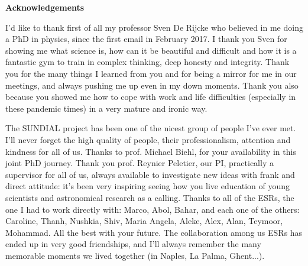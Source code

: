 \clearpage
\thispagestyle{empty}
\null%
\label{thesis:acknowledgements}
\begin{center}
  {\Large \textbf{Acknowledgements}}\\
\end{center}
{\small{}
I'd like to thank first of all my professor Sven De Rijcke who believed in me doing a PhD in physics, since the first email in February 2017.
I thank you Sven for showing me what science is, how can it be beautiful and difficult and how it is a fantastic gym to train in complex thinking, deep honesty and integrity.
Thank you for the many things I learned from you and for being a mirror for me in our meetings, and always pushing me up even in my down moments.
Thank you also because you showed me how to cope with work and life difficulties (especially in these pandemic times) in a very mature and ironic way.

The SUNDIAL project has been one of the nicest group of people I've ever met.
I'll never forget the high quality of people, their professionalism, attention and kindness for all of us. Thanks to prof. Michael Biehl, for your availability in this joint PhD journey.
Thank you prof. Reynier Peletier, our PI, practically a supervisor for all of us, always available to investigate new ideas with frank and direct attitude: %
it's been very inspiring seeing how you live education of young scientists and astronomical research as a calling.
Thanks to all of the ESRs, the one I had to work directly with: Marco, Abol, Bahar, and each one of the others: Caroline, Thanh, Nushkia, Shiv, Maria Angela, Aleke, Alex, Alan, Teymoor, Mohammad. All the best with your future.
The collaboration among us ESRs has ended up in very good friendships, and I'll always remember the many memorable moments we lived together (in Naples, La Palma, Ghent...).

}

